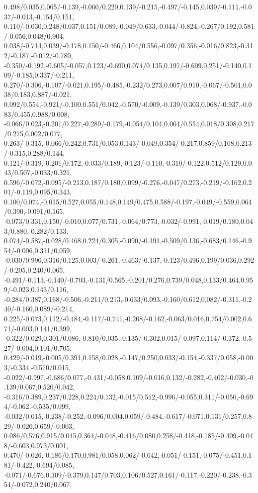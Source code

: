 {0.498/0.035,0.065/-0.139,-0.060/0.220,0.139/-0.215,-0.497/-0.145,0.039/-0.111,-0.037/-0.013,-0.154/0.151,%
0.110/-0.030,0.248/0.037,0.151/0.089,-0.049/0.633,-0.044/-0.824,-0.267/0.192,0.581/-0.056,0.048/0.904,%
0.038/-0.714,0.039/-0.178,0.150/-0.466,0.104/0.556,-0.097/0.356,-0.016/0.823,-0.312/-0.187,-0.012/-0.780,%
-0.350/-0.192,-0.605/-0.057,0.123/-0.690,0.074/0.135,0.197/-0.609,0.251/-0.140,0.109/-0.185,0.337/-0.211,%
0.270/-0.306,-0.107/-0.021,0.195/-0.485,-0.232/0.273,0.007/0.910,-0.067/-0.501,0.038/0.183,0.887/-0.021,%
0.092/0.554,-0.921/-0.100,0.551/0.042,-0.570/-0.009,-0.139/0.303,0.068/-0.937,-0.083/0.455,0.988/0.008,%
-0.066/0.023,-0.201/0.227,-0.289/-0.179,-0.054/0.104,0.064/0.554,0.018/0.308,0.217/0.275,0.002/0.077,%
0.263/-0.315,-0.066/0.242,0.731/0.053,0.143/-0.049,0.354/-0.217,0.859/0.108,0.213/-0.315,0.288/0.144,%
0.121/-0.319,-0.201/0.172,-0.033/0.189,-0.123/-0.110,-0.310/-0.122,0.512/0.129,0.043/0.507,-0.033/0.321,%
0.596/-0.072,-0.095/-0.213,0.187/0.180,0.099/-0.276,-0.047/0.273,-0.219/-0.162,0.201/-0.119,0.095/0.343,%
0.100/0.074,-0.015/0.527,0.055/0.148,0.149/0.475,0.588/-0.197,-0.049/-0.559,0.064/0.390,-0.091/0.165,%
-0.073/0.331,0.150/-0.010,0.077/0.731,-0.064/0.773,-0.032/-0.991,-0.019/0.180,0.043/0.880,-0.282/0.133,%
0.074/-0.587,-0.028/0.468,0.224/0.305,-0.090/-0.191,-0.509/0.136,-0.683/0.146,-0.954/-0.006,0.311/0.059,%
-0.030/0.996,0.316/0.125,0.003/-0.261,-0.463/-0.137,-0.123/0.496,0.199/0.036,0.292/-0.205,0.240/0.065,%
-0.491/-0.113,-0.140/-0.703,-0.131/0.565,-0.201/0.276,0.739/0.048,0.133/0.464,0.959/-0.023,0.143/0.116,%
-0.284/0.387,0.168/-0.506,-0.211/0.213,-0.633/0.093,-0.160/0.612,0.082/-0.311,-0.240/-0.160,0.089/-0.214,%
0.225/-0.073,0.112/-0.484,-0.117/-0.741,-0.208/-0.162,-0.063/0.016,0.754/0.002,0.671/-0.003,0.141/0.399,%
-0.322/0.029,0.301/0.086,-0.810/0.035,-0.135/-0.302,0.015/-0.097,0.114/-0.372,-0.527/-0.004,0.101/0.705,%
0.429/-0.019,-0.005/0.391,0.158/0.028,-0.147/0.250,0.033/-0.154,-0.337/0.058,-0.003/-0.334,-0.570/0.015,%
-0.022/-0.997,-0.686/0.077,-0.431/-0.058,0.109/-0.016,0.132/-0.282,-0.402/-0.030,-0.139/0.067,0.520/0.042,%
-0.316/0.389,0.237/0.228,0.224/0.132,-0.015/0.512,-0.996/-0.055,0.311/-0.050,-0.694/-0.062,-0.535/0.099,%
-0.032/0.015,-0.238/-0.252,-0.096/0.004,0.059/-0.484,-0.617/-0.071,0.131/0.257,0.829/-0.020,0.659/-0.003,%
0.086/0.576,0.915/0.045,0.364/-0.048,-0.416/0.080,0.258/-0.418,-0.185/-0.409,-0.048/-0.603,0.973/0.001,%
0.470/-0.026,-0.186/0.170,0.981/0.058,0.062/-0.642,-0.051/-0.151,-0.075/-0.451,0.181/-0.422,-0.694/0.085,%
-0.071/-0.676,0.309/-0.379,0.147/0.703,0.106/0.527,0.161/-0.117,-0.220/-0.238,-0.354/-0.072,0.240/0.067,%
}
